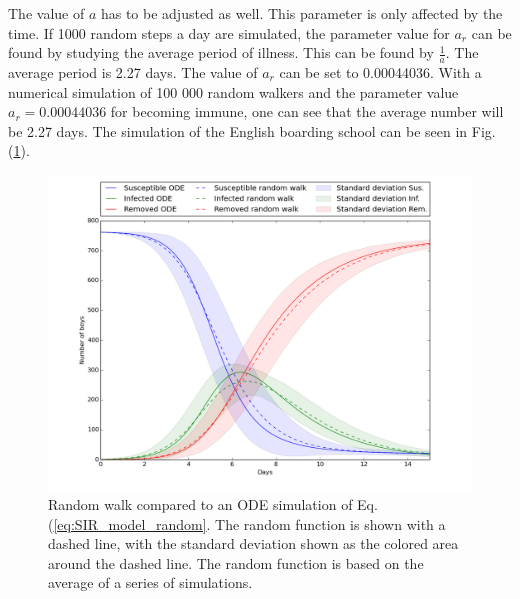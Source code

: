 \documentclass[%
twoside,                 %
final,                   %
chapterprefix=true,      %
open=right               %
10pt]{book}
\begin{document}
\vspace{3mm}




\vspace{3mm}


The value of $a$ has to be adjusted as well. This parameter is only affected by the time. If 1000 random steps a day are simulated, the parameter value for $a_r$ can be found by studying the average period of illness. This can be found by $\frac{1}{a}$. The average period is 2.27 days. The value of $a_r$ can be set to 0.00044036. With a numerical simulation of 100 000 random walkers and the parameter value $a_r=0.00044036$ for becoming immune, one can see that the average number will be 2.27 days. The simulation of the English boarding school can be seen in Fig.(\ref{fig:english_school_random}).


\begin{figure}[ht]
  \centerline{\includegraphics[width=0.8\linewidth]{3_fig/english_school_random.png}}
  \caption{
  \label{fig:english_school_random}Random walk compared to an ODE simulation of Eq.(\ref{eq:SIR_model_random}. The random function is shown with a dashed line, with the standard deviation shown as the colored area around the dashed line. The random function is based on the average of a series of simulations.
  }
\end{figure}
\end{document}
